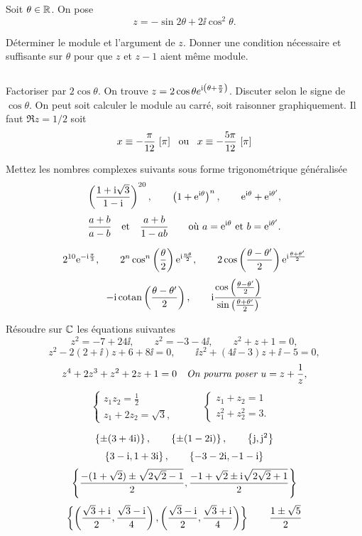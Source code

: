 \documentclass{magnolia}
\begin{document}
Soit $\theta\in\mathbb{R}$. On pose
$$z=-\sin 2\theta+2\ii\cos^2 \theta.$$
\begin{questions}
\question Déterminer le module et l'argument de $z$.
\question Donner une condition nécessaire et suffisante sur $\theta$ pour que
  $z$ et $z-1$ aient même module.
\end{questions}
\begin{sol}
$\quad$
\begin{questions}
\question Factoriser par $2\cos\theta$. On trouve
  $z=2\cos\theta e^{{\rm i}\left(\theta+\frac{\pi}{2}\right)}$. Discuter selon le signe de
  $\cos\theta$.
  \question On peut soit calculer le module au carré, soit raisonner
    graphiquement. Il faut $\Re z=1/2$ soit
    \[x\equiv-\frac{\pi}{12}\ [\pi] \quad\!\text{ou}\quad\! x\equiv -\frac{5\pi}{12}\ [\pi]\]
\end{questions}
\end{sol}

Mettez les nombres complexes suivants sous forme trigonométrique généralisée
$$\left(\frac{1+{\rm i}\sqrt{3}}{1-{\rm i}}\right)^{20}, \qquad \left(1+{\rm e}^{{\rm i}\theta}\right)^n, \qquad
  {\rm e}^{{\rm i}\theta}+{\rm e}^{{\rm i}\theta'},$$
$$\frac{a+b}{a-b} \quad \text{et} \quad \frac{a+b}{1-ab} \qquad
  \text{où $a={\rm e}^{{\rm i}\theta}$ et $b={\rm e}^{{\rm i}\theta'}$}.$$
\begin{sol}
\[2^{10} {\rm e}^{-{\rm i}\frac{\pi}{3}}, \qquad 2^n\cos^n\left(\frac{\theta}{2}\right){\rm e}^{{\rm i}\frac{n\theta}{2}},
  \qquad 2\cos\left(\frac{\theta-\theta'}{2}\right){\rm e}^{{\rm i}\frac{\theta+\theta'}{2}}\]
\[-{\rm i}\operatorname{cotan}\left(\frac{\theta-\theta'}{2}\right), \qquad
  {\rm i}\frac{\cos\left(\frac{\theta-\theta'}{2}\right)}{\sin\left(\frac{\theta+\theta'}{2}\right)}\]
\end{sol}










Résoudre sur $\mathbb{C}$ les équations suivantes
$$z^2=-7+24\ii, \qquad z^2=-3-4\ii, \qquad z^2+z+1=0,$$
$$z^2-2(2+\ii)z+6+8\ii=0, \qquad \ii z^2+(4\ii -3)z+\ii-5=0,$$
$$z^4+2z^3+z^2+2z+1=0 \quad \text{\it On pourra poser $u=z+\frac{1}{z}$},$$
$$\begin{cases}
  z_1 z_2=\frac{1}{2} &\\
  z_1+2z_2 = \sqrt{3}, &
  \end{cases}
  \qquad
  \begin{cases}
  z_1 + z_2=1 &\\
  z_1^2+z_2^2 = 3. &
  \end{cases}
$$
\begin{sol}
\[\left\{\pm(3+4{\rm i})\right\}, \qquad \left\{\pm(1-2{\rm i})\right\}, \qquad \left\{{\rm j},{\rm j}^2\right\}\]
\[\left\{3-{\rm i},1+3{\rm i}\right\}, \qquad \left\{-3-2{\rm i},-1-{\rm i}\right\}\]
\[\left\{\frac{-(1+\sqrt{2})\pm\sqrt{2\sqrt{2}-1}}{2},\frac{-1+\sqrt{2}\pm {\rm i} \sqrt{2\sqrt{2}+1}}{2}\right\}\]
\[\left\{\left(\frac{\sqrt{3}+{\rm i}}{2},\frac{\sqrt{3}-{\rm i}}{4}\right), \left(\frac{\sqrt{3}-{\rm i}}{2},\frac{\sqrt{3}+{\rm i}}{4}\right)\right\} \qquad
  \frac{1\pm\sqrt{5}}{2}\]
\end{sol}
\end{document}
